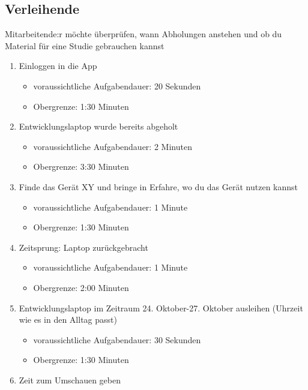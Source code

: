 \subsection{Verleihende}
{\sffamily\color{maincolor}{Szenario:}} Mitarbeitende:r möchte überprüfen, wann Abholungen anstehen und ob du Material für eine Studie gebrauchen kannst
\begin{enumerate}
    \item Einloggen in die App
            \begin{itemize}
                \item voraussichtliche Aufgabendauer: 20 Sekunden
                \item Obergrenze: 1:30 Minuten
            \end{itemize}
    \item Entwicklungslaptop wurde bereits abgeholt
            \begin{itemize}
                \item voraussichtliche Aufgabendauer: 2 Minuten
                \item Obergrenze: 3:30 Minuten
            \end{itemize}
    \item Finde das Gerät XY und bringe in Erfahre, wo du das Gerät nutzen kannst
            \begin{itemize}
                \item voraussichtliche Aufgabendauer: 1 Minute
                \item Obergrenze: 1:30 Minuten
            \end{itemize}
    \item Zeitsprung: Laptop zurückgebracht
            \begin{itemize}
                \item voraussichtliche Aufgabendauer: 1 Minute
                \item Obergrenze: 2:00 Minuten
            \end{itemize}
    \item Entwicklungslaptop im Zeitraum 24. Oktober-27. Oktober ausleihen (Uhrzeit wie es in den Alltag passt)
            \begin{itemize}
                \item voraussichtliche Aufgabendauer: 30 Sekunden
                \item Obergrenze: 1:30 Minuten
            \end{itemize}
    \item Zeit zum Umschauen geben
\end{enumerate}

